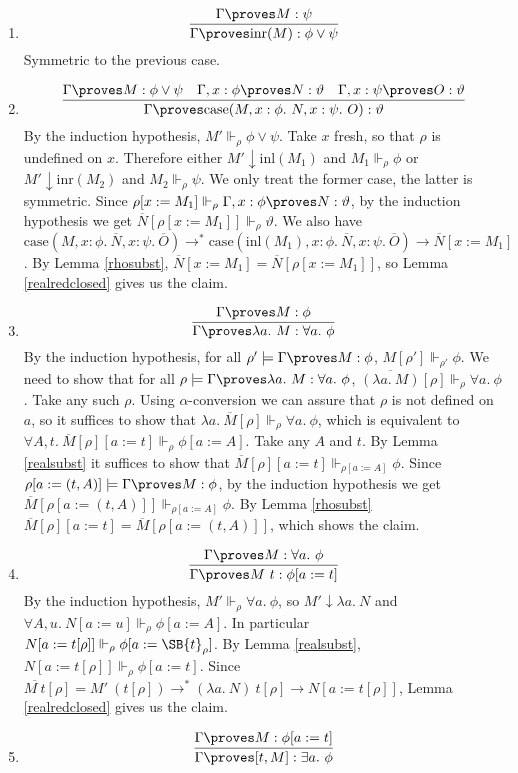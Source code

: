 \documentclass{LMCS}
\newcommand{\ov}[1]{\ensuremath{\overline{#1}}}
\newcommand\reals{\ensuremath{\Vdash}}
\newcommand{\g}{\Gamma}
\newcommand{\gp}{\Gamma \proves}
\newcommand{\rrho}{\reals_\rho}
\newcommand{\pl}[1]{\ensuremath{\mathrm{#1}}}
\newcommand{\CASE}{\pl{case}}\newcommand{\DOM}{\pl{dom}}
\newcommand{\INL}{\pl{inl}}
\newcommand{\INR}{\pl{inr}}
\newcommand{\sr}[1]{\ensuremath{\SB{#1}_\rho}}
\begin{document}
\begin{enumerate}[$\bullet$]
\item
\[
\infer{\gp \INR(M) : \phi \lor \psi}{\gp M : \psi}
\]
Symmetric to the previous case.
\item 
\[
\infer{\gp \CASE(M, x : \phi.\ N, x : \psi.\ O) : \vartheta}{\gp M :
\phi \lor \psi & \g, x : \phi \proves N : \vartheta & \g, x : \psi \proves O : \vartheta}
\]
By the induction hypothesis, $M' \rrho \phi \lor \psi$. Take $x$ fresh, so
that $\rho$ is undefined on $x$. Therefore either $M'
\downarrow \INL(M_1)$ and $M_1 \rrho \phi$ or $M' \downarrow \INR(M_2)$ and
$M_2 \rrho \psi$. We only treat the former case, the latter is symmetric.
Since $\rho[x:=M_1] \rrho \g, x : \phi \proves N : \vartheta$, by the
induction hypothesis we get $\ov{N}[\rho[x:=M_1]] \rrho \vartheta$. We also
have $\CASE(M, x : \phi.\ \ov{N}, x : \psi.\ \ov{O}) \to^* \CASE(\INL(M_1), x :
\phi.\ \ov{N}, x : \psi.\ \ov{O}) \to \ov{N}[x:=M_1]$. By Lemma
\ref{rhosubst}, $\ov{N}[x:=M_1] =
\ov{N}[\rho[x:=M_1]]$, so Lemma \ref{realredclosed} gives us the claim.
\item
\[
\infer{\gp \lambda a.\ M : \forall a.\ \phi}{\gp M : \phi}
\]
By the induction hypothesis, for all $\rho' \models \gp M : \phi$, $M[\rho']
\reals_{\rho'} \phi$. We need to show that for all $\rho \models \gp \lambda a.\ M :
\forall a.\ \phi$, $\ov{(\lambda a.\ M)}[\rho] \reals_\rho \forall a.\
\phi$. Take any such $\rho$.  Using $\alpha$-conversion we can assure that $\rho$ is not defined on
$a$, so it suffices to show that $\lambda a.\ \ov{M}[\rho] \rrho \forall a.\ \phi$,
which is equivalent to $\forall A, t.\ \ov{M}[\rho][a:=t] \reals_\rho
\phi[a:=A]$. Take any $A$ and $t$. By Lemma \ref{realsubst} it suffices to
show that $\ov{M}[\rho][a:=t] \reals_{\rho[a:=A]} \phi$. 
Since $\rho[a:=(t, A)] \models \gp M : \phi$, by the induction hypothesis we get 
$\ov{M}[\rho[a:=(t, A)]] \reals_{\rho[a:=A]} \phi$. By Lemma \ref{rhosubst}
$\ov{M}[\rho][a:=t] =
\ov{M}[\rho[a:=(t, A)]]$, which shows the claim. 
\item
\[
\infer{\gp M\ t : \phi[a:=t]}{\gp M : \forall a.\ \phi}
\]
By the induction hypothesis, $M' \reals_\rho \forall a.\ \phi$, so $M' \downarrow \lambda a.\ N$
and $\forall A, u.\ N[a:=u] \reals_\rho \phi[a:=A]$. In particular $N[a:=t[\rho]]
\rrho \phi[a:=\sr{t}]$. By Lemma \ref{realsubst}, $N[a:=t[\rho]] \reals_\rho
\phi[a:=t]$. Since $\ov{M\ t}[\rho] = M'\ (t[\rho]) \to^* (\lambda a.\ N)\ t[\rho] \to
N[a:=t[\rho]]$, Lemma \ref{realredclosed} gives us  the claim.
\item 
\[
\infer{\gp [t, M] : \exists a.\ \phi}{\gp M : \phi[a:=t]}
\]
\end{enumerate}
\end{document}

